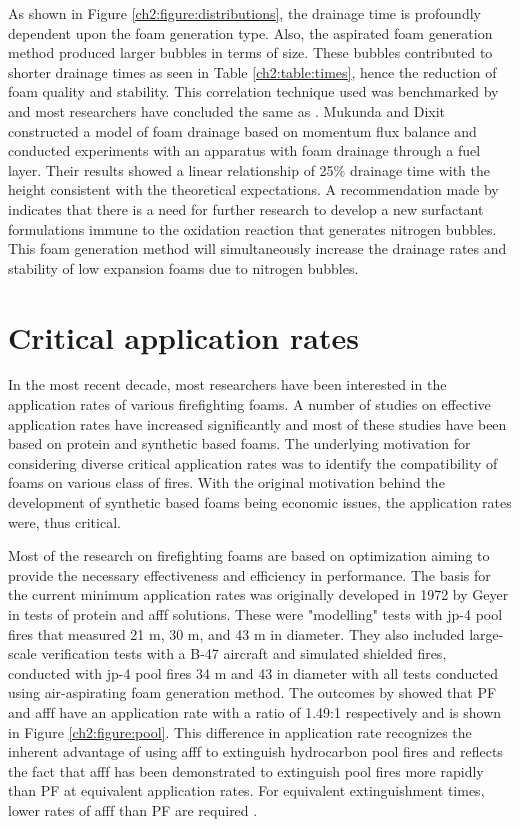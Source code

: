 As shown in Figure \ref{ch2:figure:distributions}, the drainage time is profoundly dependent upon the foam generation type. Also, the aspirated foam generation method produced larger bubbles in terms of size. These bubbles contributed to shorter drainage times as seen in Table \ref{ch2:table:times}, hence the reduction of foam quality and stability. This correlation technique used was benchmarked by \cite{oguike2013study} and most researchers have concluded the same as \cite{laundess2012suppression}. Mukunda and Dixit \cite{csb2016phenomenological} constructed a model of foam drainage based on momentum flux balance and conducted experiments with an apparatus with foam drainage through a fuel layer. Their results showed a linear relationship of 25\% drainage time with the height consistent with the theoretical expectations. A recommendation made by \cite{laundess2012suppression} indicates that there is a need for further research to develop a new surfactant formulations immune to the oxidation reaction that generates nitrogen bubbles. This foam generation method will simultaneously increase the drainage rates and stability of low expansion foams due to nitrogen bubbles.

\section{Critical application rates}
In the most recent decade, most researchers have been interested in the application rates of various firefighting foams. A number of studies on effective application rates have increased significantly and most of these studies have been based on protein and synthetic based foams. The underlying motivation for considering diverse critical application rates was to identify the compatibility of foams on various class of fires. With the original motivation behind the development of synthetic based foams being economic issues, the application rates were, thus critical.

Most of the research on firefighting foams are based on optimization aiming to provide the necessary effectiveness and efficiency in performance. The basis for the current minimum application rates was originally developed in 1972 by Geyer \cite{geyer1972evaluation} in tests of protein and \acrshort{afff} solutions. These were "modelling" tests with \acrfull{jp-4} pool fires that measured 21 m, 30 m, and 43 m in diameter. They also included large-scale verification tests with a B-47 aircraft and simulated shielded fires, conducted with \acrshort{jp-4} pool fires 34 m and 43 in diameter with all tests conducted using air-aspirating foam generation method. The outcomes by \cite{geyer1972evaluation} showed that PF and \acrshort{afff} have an application rate with a ratio of 1.49:1 respectively and is shown in Figure \ref{ch2:figure:pool}. This difference in application rate recognizes the inherent advantage of using \acrshort{afff} to extinguish hydrocarbon pool fires and reflects the fact that \acrshort{afff} has been demonstrated to extinguish pool fires more rapidly than PF at equivalent application rates. For equivalent extinguishment times, lower rates of \acrshort{afff} than PF are required \cite{scheffey1995evaluating}.

